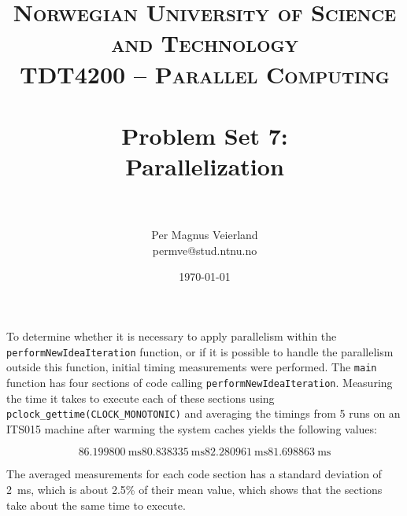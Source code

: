 

\title{	
\normalfont \normalsize 
\textsc{Norwegian University of Science and Technology\\TDT4200 -- Parallel Computing} \\ [25pt]
\horrule{0.5pt} \\[0.4cm]
\huge Problem Set 7:\\ Parallelization\\
\horrule{2pt} \\[0.5cm]
}

\author{Per Magnus Veierland\\permve@stud.ntnu.no}


\date{\normalsize\today}



\maketitle

To determine whether it is necessary to apply parallelism within the \texttt{performNewIdeaIteration} function, or if it is possible to handle the parallelism outside this function, initial timing measurements were performed. The \texttt{main} function has four sections of code calling \texttt{performNewIdeaIteration}. Measuring the time it takes to execute each of these sections using \texttt{pclock_gettime(CLOCK\_MONOTONIC)} and averaging the timings from 5 runs on an \textsc{ITS015} machine after warming the system caches yields the following values:

\begin{displaymath}
86.199800~\text{ms} 80.838335~\text{ms} 82.280961~\text{ms} 81.698863~\text{ms}
\end{displaymath}

The averaged measurements for each code section has a standard deviation of 2~ms, which is about 2.5\% of their mean value, which shows that the sections take about the same time to execute.



